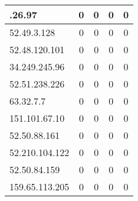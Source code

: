 \documentclass{article}
\begin{document}
\begin{longtable}{|>{\raggedright\arraybackslash}p{3cm}|c|c|c|c|}
    109.68.26.97 & 0 & 0 & 0 & 0 \\
    \hline
    
    
    \rowcolor{lightgreen} %
    
    52.49.3.128 & 0 & 0 & 0 & 0 \\
    \hline
    
    
    \rowcolor{lightgreen} %
    
    52.48.120.101 & 0 & 0 & 0 & 0 \\
    \hline
    
    
    \rowcolor{lightgreen} %
    
    34.249.245.96 & 0 & 0 & 0 & 0 \\
    \hline
    
    
    \rowcolor{lightgreen} %
    
    52.51.238.226 & 0 & 0 & 0 & 0 \\
    \hline
    
    
    \rowcolor{lightgreen} %
    
    63.32.7.7 & 0 & 0 & 0 & 0 \\
    \hline
    
    
    \rowcolor{lightgreen} %
    
    151.101.67.10 & 0 & 0 & 0 & 0 \\
    \hline
    
    
    \rowcolor{lightgreen} %
    
    52.50.88.161 & 0 & 0 & 0 & 0 \\
    \hline
    
    
    \rowcolor{lightgreen} %
    
    52.210.104.122 & 0 & 0 & 0 & 0 \\
    \hline
    
    
    \rowcolor{lightgreen} %
    
    52.50.84.159 & 0 & 0 & 0 & 0 \\
    \hline
    
    
    \rowcolor{lightgreen} %
    
    159.65.113.205 & 0 & 0 & 0 & 0 \\
    \hline
    

\end{longtable}
\end{document}

